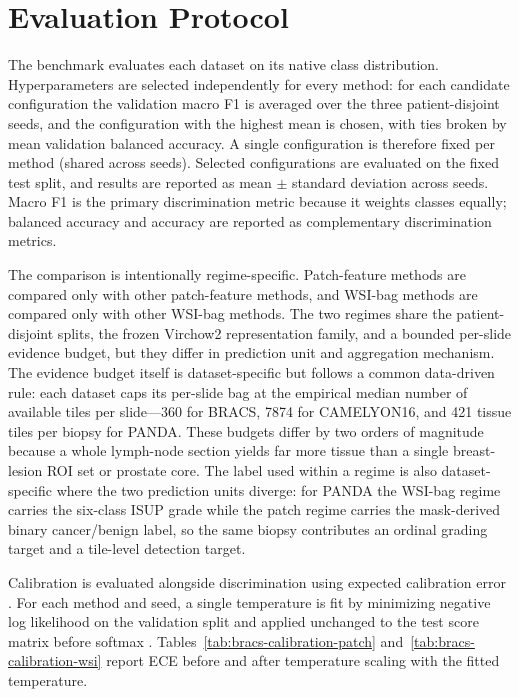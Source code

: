 \documentclass[11pt]{article}
\begin{document}
\section{Evaluation Protocol}
\label{sec:evaluation}
The benchmark evaluates each dataset on its native class distribution. Hyperparameters are selected independently for every method: for each candidate configuration the validation macro F1 is averaged over the three patient-disjoint seeds, and the configuration with the highest mean is chosen, with ties broken by mean validation balanced accuracy. A single configuration is therefore fixed per method (shared across seeds). Selected configurations are evaluated on the fixed test split, and results are reported as mean $\pm$ standard deviation across seeds. Macro F1 is the primary discrimination metric because it weights classes equally; balanced accuracy and accuracy are reported as complementary discrimination metrics.

The comparison is intentionally regime-specific. Patch-feature methods are compared only with other patch-feature methods, and WSI-bag methods are compared only with other WSI-bag methods. The two regimes share the patient-disjoint splits, the frozen Virchow2 representation family, and a bounded per-slide evidence budget, but they differ in prediction unit and aggregation mechanism. The evidence budget itself is dataset-specific but follows a common data-driven rule: each dataset caps its per-slide bag at the empirical median number of available tiles per slide---\num{360} for BRACS, \num{7874} for CAMELYON16, and \num{421} tissue tiles per biopsy for PANDA. These budgets differ by two orders of magnitude because a whole lymph-node section yields far more tissue than a single breast-lesion ROI set or prostate core. The label used within a regime is also dataset-specific where the two prediction units diverge: for PANDA the WSI-bag regime carries the six-class ISUP grade while the patch regime carries the mask-derived binary cancer/benign label, so the same biopsy contributes an ordinal grading target and a tile-level detection target.

Calibration is evaluated alongside discrimination using expected calibration error \citep[ECE;][]{naeini2015obtaining,guo2017calibration}. For each method and seed, a single temperature is fit by minimizing negative log likelihood on the validation split and applied unchanged to the test score matrix before softmax \citep{guo2017calibration}. Tables~\ref{tab:bracs-calibration-patch} and~\ref{tab:bracs-calibration-wsi} report ECE before and after temperature scaling with the fitted temperature.
\end{document}
